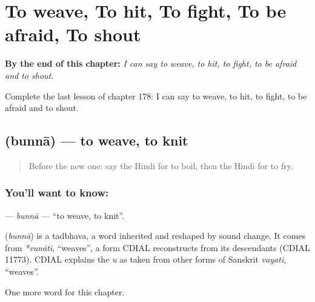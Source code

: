 
\chapter{To weave, To hit, To fight, To be afraid, To shout}
\label{ch:hi-to-weave-to-hit-to-fight-to-be-afraid-to-shout}

\begin{chapteropening}
\textbf{By the end of this chapter:} \emph{I can say to weave, to hit, to fight, to be afraid and to shout.}

Complete the last lesson of chapter 178: I can say to weave, to hit, to fight, to be afraid and to shout.
\end{chapteropening}

\section[\texorpdfstring{\hi{बुनना} (bunnā)}{बुनना (bunnā)}]{ (bunnā) — to weave, to knit}

\label{lesson:HI-C178-bunna}



\begin{quote}
Before the new one: say the Hindi for to boil, then the Hindi for to fry.
\end{quote}

\subsection*{You'll want to know: }
\textbf{} — \emph{bunnā} — \textquotedblleft{}to weave, to knit\textquotedblright{}.

\begin{cousinweb}
\textbf{} (\emph{bunnā}) is a tadbhava, a word inherited and reshaped by sound change. It comes from \emph{*vunāti}, \textquotedblleft{}weaves\textquotedblright{}, a form CDIAL reconstructs from its descendants (CDIAL 11773). CDIAL explains the \emph{u} as taken from other forms of Sanskrit \emph{vayati}, \textquotedblleft{}weaves\textquotedblright{}.
\end{cousinweb}

\begin{grammarlens}[title={What you've built}]
One more word for this chapter.
\end{grammarlens}


